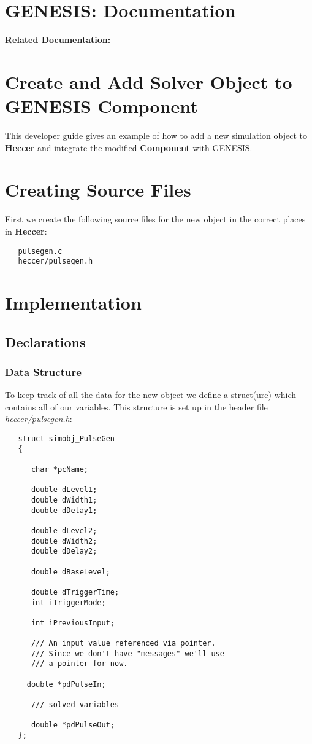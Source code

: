 \documentclass[12pt]{article}
\begin{document}
\section*{GENESIS: Documentation}

{\bf Related Documentation:}

\section*{Create and Add Solver Object to GENESIS Component}

This developer guide gives an example of how to add a new simulation object to {\bf Heccer} and integrate the modified \href{../reserved-names/reserved-names.tex}{\bf Component} with GENESIS.

\section*{Creating Source Files}

First we create the following source files for the new object in the correct places in {\bf Heccer}:
\begin{verbatim}
   pulsegen.c
   heccer/pulsegen.h
\end{verbatim}

\section*{Implementation}

\subsection*{Declarations}

\subsubsection*{Data Structure}

To keep track of all the data for the new object we define a struct(ure) which contains all of our variables. This structure is set up in the header file {\it heccer/pulsegen.h}:
\begin{verbatim}
   struct simobj_PulseGen
   {
   
      char *pcName;

      double dLevel1;
      double dWidth1;
      double dDelay1;

      double dLevel2;
      double dWidth2;
      double dDelay2;

      double dBaseLevel;

      double dTriggerTime;
      int iTriggerMode;
  
      int iPreviousInput;

      /// An input value referenced via pointer. 
      /// Since we don't have "messages" we'll use 
      /// a pointer for now.
  
     double *pdPulseIn;

      /// solved variables

      double *pdPulseOut;
   };
\end{verbatim}
\end{document}
